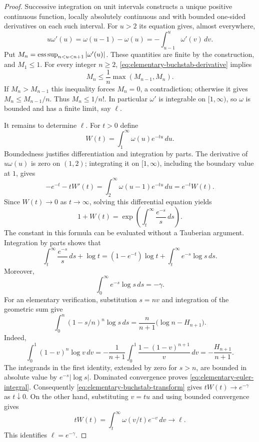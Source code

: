 \begin{proof}
Successive integration on unit intervals constructs a unique positive
continuous function, locally absolutely continuous and with bounded
one-sided derivatives on each such interval.  For $u>2$ its equation
gives, almost everywhere,
\begin{equation}\label{eq:elementary-buchstab-derivative}
 u\omega'(u)=\omega(u-1)-\omega(u)
             =-\int_{u-1}^{u}\omega'(v)\,dv.
\end{equation}
Put $M_n=\mathop{\rm ess\,sup}_{n<u<n+1}|\omega'(u)|$.
These quantities are finite by the construction, and $M_1\le1$.
For every integer $n\ge2$, \eqref{eq:elementary-buchstab-derivative}
implies
\[
 M_n\le\frac1n\max(M_{n-1},M_n).
\]
If $M_n>M_{n-1}$ this inequality forces $M_n=0$, a contradiction;
otherwise it gives $M_n\le M_{n-1}/n$.  Thus $M_n\le1/n!$.
In particular $\omega'$ is integrable on $[1,\infty)$, so $\omega$
is bounded and has a finite limit, say $\ell$.

It remains to determine $\ell$.  For $t>0$ define
\[
 W(t)=\int_1^\infty\omega(u)e^{-tu}\,du.
\]
Boundedness justifies differentiation and integration by parts.
The derivative of $u\omega(u)$ is zero on $(1,2)$; integrating it
on $[1,\infty)$, including the boundary value at $1$, gives
\[
 -e^{-t}-tW'(t)
   =\int_2^\infty\omega(u-1)e^{-tu}\,du
   =e^{-t}W(t).
\]
Since $W(t)\to0$ as $t\to\infty$, solving this differential equation
yields
\begin{equation}\label{eq:elementary-buchstab-transform}
 1+W(t)=\exp\!\left(\int_t^\infty\frac{e^{-s}}s\,ds\right).
\end{equation}
The constant in this formula can be evaluated without a Tauberian
argument.  Integration by parts shows that
\[
 \int_t^\infty\frac{e^{-s}}s\,ds+\log t
  =(1-e^{-t})\log t+\int_t^\infty e^{-s}\log s\,ds.
\]
Moreover,
\begin{equation}\label{eq:elementary-euler-integral}
 \int_0^\infty e^{-s}\log s\,ds=-\gamma.
\end{equation}
For an elementary verification, substitution $s=nv$ and integration
of the geometric sum give
\[
 \int_0^n(1-s/n)^n\log s\,ds
   =\frac{n}{n+1}\bigl(\log n-H_{n+1}\bigr).
\]
Indeed,
\[
 \int_0^1(1-v)^n\log v\,dv
  =-\frac1{n+1}\int_0^1\frac{1-(1-v)^{n+1}}v\,dv
  =-\frac{H_{n+1}}{n+1}.
\]
The integrands in the first identity, extended by zero for $s>n$,
are bounded in absolute value by $e^{-s}|\log s|$.  Dominated
convergence proves \eqref{eq:elementary-euler-integral}.
Consequently \eqref{eq:elementary-buchstab-transform} gives
$tW(t)\to e^{-\gamma}$ as $t\downarrow0$.
On the other hand, substituting $v=tu$ and using bounded convergence
gives
\[
 tW(t)=\int_t^\infty\omega(v/t)e^{-v}\,dv\longrightarrow\ell.
\]
This identifies $\ell=e^{-\gamma}$.
\end{proof}

